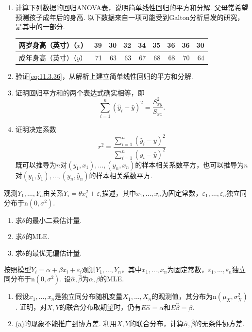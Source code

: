 \begin{exercise}\label{exercise:11.34}\leavevmode
\begin{enumerate}[label=(\alph*)]
\item\label{item:11.34.a} 计算下列数据的回归ANOVA表，说明简单线性回归的平方和分解. 父母常希望预测孩子成年后的身高. 以下数据来自一项可能受到Galton分析启发的研究，是其中的一部分.
\begin{center}
\begin{tabular}{lrrrrrrrr}
\toprule 两岁身高（英寸）（$x$）&39&30&32&34&35&36&36&30\\\midrule
成年身高（英寸）（$y$）&71&63&63&67&68&68&70&64\\\bottomrule
\end{tabular}
\end{center}
\item\label{item:11.34.b} 验证\eqref{eq:11.3.36}，从解析上建立简单线性回归的平方和分解.
\item\label{item:11.34.c} 证明回归平方和的两个表达式确实相等，即
$$\sum_{i=1}^n(\hat y_i-\bar y)^2=\frac{S_{xy}^2}{S_{xx}}.$$
\item\label{item:11.34.d} 证明决定系数
$$r^2=\frac{\sum_{i=1}^n(\hat y_i-\bar y)^2}{\sum_{i=1}^n(y_i-\bar y)^2}$$
既可以推导为$n$对$(y_1,x_1),\allowbreak\ldots,\allowbreak(y_n,x_n)$的样本相关系数平方，也可以推导为$n$对$(y_1,\hat y_1),\allowbreak\ldots,\allowbreak(y_n,\hat y_n)$的样本相关系数平方.
\end{enumerate}
\end{exercise}

\begin{exercise}\label{exercise:11.35}
观测$Y_1,\ldots,Y_n$由关系$Y_i=\theta x_i^2+\varepsilon_i$描述，其中$x_1,\ldots,x_n$为固定常数，$\varepsilon_1,\ldots,\varepsilon_n$独立同分布于$\mathrm n(0,\sigma^2)$.
\begin{enumerate}[label=(\alph*)]
\item\label{item:11.35.a} 求$\theta$的最小二乘估计量.
\item\label{item:11.35.b} 求$\theta$的MLE.
\item\label{item:11.35.c} 求$\theta$的最优无偏估计量.
\end{enumerate}
\end{exercise}

\begin{exercise}\label{exercise:11.36}
按照模型$Y_i=\alpha+\beta x_i+\varepsilon_i$观测$Y_1,\ldots,Y_n$，其中$x_1,\ldots,x_n$为固定常数，$\varepsilon_1,\ldots,\varepsilon_n$独立同分布于$\mathrm n(0,\sigma^2)$. 设$\hat\alpha,\hat\beta$为$\alpha,\beta$的MLE.
\begin{enumerate}[label=(\alph*)]
\item\label{item:11.36.a} 假设$x_1,\ldots,x_n$是独立同分布随机变量$X_1,\ldots,X_n$的观测值，其分布为$\mathrm n(\mu_X,\sigma_X^2)$. 证明，对$X,Y$的联合分布取期望时，仍有$E\hat\alpha=\alpha$和$E\hat\beta=\beta$.
\item\label{item:11.36.b} \hyperref[item:11.36.a]{(a)}的现象不能推广到协方差. 利用$X,Y$的联合分布，计算$\hat\alpha,\hat\beta$的无条件协方差.
\end{enumerate}
\end{exercise}

